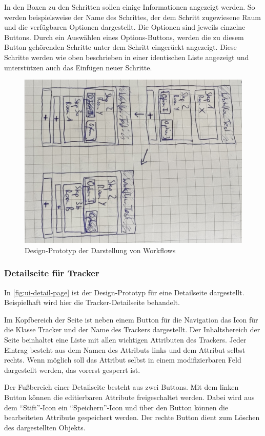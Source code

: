 In den Boxen zu den Schritten sollen einige Informationen angezeigt werden.
So werden beispielsweise der Name des Schrittes, der dem Schritt zugewiesene Raum und die
verfügbaren Optionen dargestellt.
Die Optionen sind jeweils einzelne Buttons.
Durch ein Auswählen eines Options-Buttons, werden die zu diesem Button gehörenden Schritte unter dem Schritt eingerückt angezeigt.
Diese Schritte werden wie oben beschrieben in einer identischen Liste angezeigt und unterstützen auch das Einfügen neuer Schritte.

\begin{figure}[h!tbp]
	\includegraphics[width=.7\textwidth]{images/ui-prototype/workflow.jpg}
	\centering
	\caption{Design-Prototyp der Darstellung von Workflows}
	\label{fig:ui-workflow}
\end{figure}

\subsubsection{Detailseite für Tracker} \label{sec:app-room}
In \autoref{fig:ui-detail-page} ist der Design-Prototyp für eine Detailseite dargestellt.
Beispielhaft wird hier die Tracker-Detailseite behandelt.

Im Kopfbereich der Seite ist neben einem Button für die Navigation das Icon für die Klasse Tracker und der Name des Trackers dargestellt.
Der Inhaltsbereich der Seite beinhaltet eine Liste mit allen wichtigen Attributen des Trackers.
Jeder Eintrag besteht aus dem Namen des Attributs links und dem Attribut selbst rechts.
Wenn möglich soll das Attribut selbst in einem modifizierbaren Feld dargestellt werden, das vorerst gesperrt ist.

Der Fußbereich einer Detailseite besteht aus zwei Buttons.
Mit dem linken Button können die editierbaren Attribute freigeschaltet werden.
Dabei wird aus dem \enquote{Stift}-Icon ein \enquote{Speichern}-Icon und über den Button können die bearbeiteten Attribute gespeichert werden.
Der rechte Button dient zum Löschen des dargestellten Objekts.

